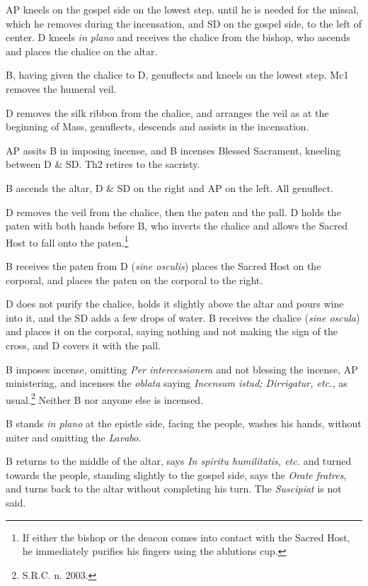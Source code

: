 {\rubric AP kneels on the gospel side on the lowest step, until he is needed for
the missal, which he removes during the incensation, and SD on the gospel side,
to the left of center. D kneels \textit{in plano} and receives the chalice from
the bishop, who ascends and places the chalice on the altar.

\rubric B, having given the chalice to D, genuflects and kneels on the lowest
step. Mc1 removes the humeral veil.

\rubric D removes the silk ribbon from the chalice, and arranges the veil as at
the beginning of Mass, genuflects, descends and assists in the incensation.

\rubric AP assits B in imposing incense, and B incenses Blessed
Sacrament, kneeling between D \& SD. Th2 retires to the sacristy.

\rubric B ascends the altar, D \& SD on the right and AP on the left. All
genuflect.

\rubric D removes the veil from the chalice, then the paten and the pall. D
holds the paten with both hands before B, who inverts the chalice and allows
the Sacred Host to fall onto the paten.\footnote{If either the bishop or the
    deacon comes into contact with the Sacred Host, he immediately purifies his
fingers using the ablutions cup.}

\rubric B receives the paten from D (\textit{sine osculis}) places the Sacred
Host on the corporal, and places the paten on the corporal to the right.

\rubric D does not purify the chalice, holds it slightly above the altar and
pours wine into it, and the SD adds a few drops of water. B receives the
chalice (\textit{sine oscula}) and places it on the corporal, saying nothing
and not making the sign of the cross, and D covers it with the pall.

\rubric B imposes incense, omitting \textit{Per intercessionem} and not
blessing the incense, AP ministering, and incenses the \textit{oblata} saying
\textit{Incensum istud; Dirrigatur, etc.,} as usual.\footnote{S.R.C. n. 2003.}
Neither B nor anyone else is incensed.

\rubric B stands \textit{in plano} at the epistle side, facing the people,
washes his hands, without miter and omitting the \textit{Lavabo.}

\rubric B returns to the middle of the altar, says \textit{In spiritu
humilitatis, etc.} and turned towards the people, standing slightly to the
gospel side, says the \textit{Orate fratres}, and turns back to the altar
without completing his turn. The \textit{Suscipiat} is not said.

}
